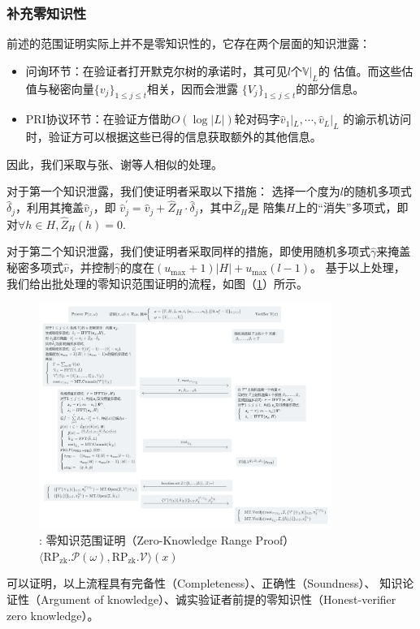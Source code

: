 \documentclass[zihao=-4]{ctexart}
\begin{document}
\subsubsection{补充零知识性}
前述的范围证明实际上并不是零知识性的，它存在两个层面的知识泄露：
\begin{itemize}
  \item 问询环节：在验证者打开默克尔树的承诺时，其可见$l$个$\mathbb{V}|_L$的
        估值。而这些估值与秘密向量$\{v_j\}_{1\le j\le t}$相关，因而会泄露
        $\{V_j\}_{1\le j\le t}$的部分信息。
  \item PRI协议环节：在验证方借助$O(\log{|L|})$轮对码字$\hat{v}_1|_L,\cdots,\hat{v}_L|_L$
        的谕示机访问时，验证方可以根据这些已得的信息获取额外的其他信息。
\end{itemize}\par
因此，我们采取与张、谢等人\cite{Fourty-two}相似的处理。\par
对于第一个知识泄露，我们使证明者采取以下措施：
选择一个度为$l$的随机多项式$\hat{\delta}_j$，利用其掩盖$\hat{v}_j$，即
$\hat{v}^{\prime}_j=\hat{v}_j+\hat{Z}_H\cdot\hat{\delta}_j$，其中$\hat{Z}_H$是
陪集$H$上的“消失”多项式，即对$\forall h\in H,\hat{Z}_H(h)=0$.\par
对于第二个知识泄露，我们使证明者采取同样的措施，即使用随机多项式$\hat{\gamma}$来掩盖
秘密多项式$\hat{v}$，并控制$\hat{\gamma}$的度在$(u_{\max}+1)|H|+u_{\max}(l-1)$。
基于以上处理，我们给出批处理的零知识范围证明的流程，如图（\ref{ZKRP流程}）所示。
\begin{figure}[H]
  \centering
  \includegraphics[width=0.85\textwidth]{./include_picture/ZKRP.png}
  \caption{: 零知识范围证明（Zero-Knowledge Range Proof）$\langle \text{RP}_{\text{zk}}.\mathcal{P}(\omega),\text{RP}_{\text{zk}}.\mathcal{V}\rangle(x)$}
  \label{ZKRP流程}
\end{figure}\par
可以证明，以上流程具有完备性（Completeness）、正确性（Soundness）、
知识论证性（Argument of knowledge）、诚实验证者前提的零知识性（Honest-verifier zero knowledge）。
\end{document}
